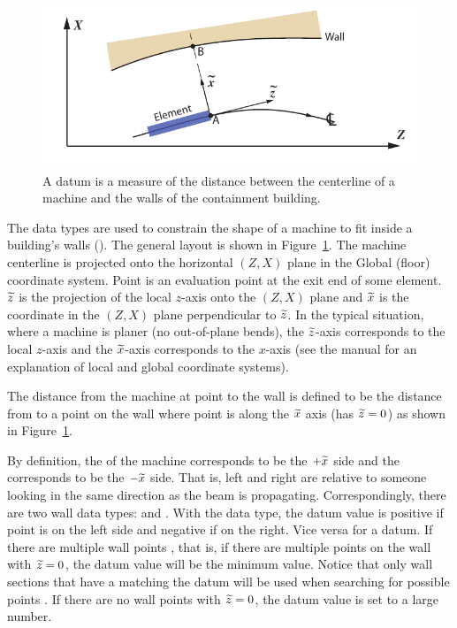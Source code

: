 \begin{description}
{\begin{figure}
  \centering
  \includegraphics[width=5in]{building-wall-constraint.pdf}
  \caption[Building wall datum]
{A  datum is a measure of the distance between the
centerline of a machine and the walls of the containment building.}
  \label{f:wall.constraint}
\end{figure}

  \item[wall.] \Newline
The  data types are used to constrain the shape of a machine
to fit inside a building's walls (). The general
layout is shown in Figure~\ref{f:wall.constraint}. The machine
centerline is projected onto the horizontal $(Z, X)$ plane in the
Global (floor) coordinate system. Point  is an evaluation point
at the exit end of some element. $\widetilde z$ is the projection of the
local $z$-axis onto the $(Z, X)$ plane and $\widetilde x$ is the coordinate
in the $(Z, X)$ plane perpendicular to $\widetilde z$. In the typical
situation, where a machine is planer (no out-of-plane bends), the $\widetilde
z$-axis corresponds to the local $z$-axis and the $\widetilde x$-axis
corresponds to the $x$-axis (see the \bmad manual for an explanation
of local and global coordinate systems).

The distance from the machine at point  to the wall is defined
to be the distance from  to a point  on the wall where
point  is along the $\widetilde x$ axis (has $\widetilde z = 0$) as shown in
Figure~\ref{f:wall.constraint}.

By definition, the  of the machine corresponds to be
the $+\widetilde x$ side and the  corresponds to be the
$-\widetilde x$ side. That is, left and right are relative to someone looking
in the same direction as the beam is propagating. Correspondingly,
there are two wall data types:  and
. With the  data type, the
datum value is positive if point  is on the left side and
negative if on the right. Vice versa for a  datum.
If there are multiple wall points , that is, if there are
multiple points on the wall with $\widetilde z = 0$, the datum value will be
the minimum value. Notice that only wall sections that have a
 matching the datum will be used when searching for
possible points . If there are no wall points with $\widetilde z = 0$,
the datum value is set to a large number.

}
\end{description}
